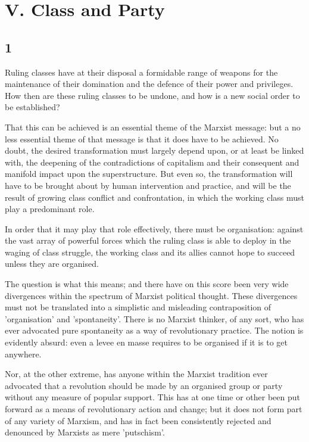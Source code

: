 \chapter*{V. Class and Party}


\section*{1}

Ruling classes have at their disposal a formidable range of weapons for the maintenance of their domination and the defence of their power and privileges. How then are these ruling classes to be undone, and how is a new social order to be established?

That this can be achieved is an essential theme of the Marxist message: but a no less essential theme of that message is that it does have to be achieved. No doubt, the desired transformation must largely depend upon, or at least be linked with, the deepening of the contradictions of capitalism and their consequent and manifold impact upon the superstructure. But even so, the transformation will have to be brought about by human intervention and practice, and will be the result of growing class conflict and confrontation, in which the working class must play a predominant role.

In order that it may play that role effectively, there must be organisation: against the vast array of powerful forces which the ruling class is able to deploy in the waging of class struggle, the working class and its allies cannot hope to succeed unless they are organised.

The question is what this means; and there have on this score been very wide divergences within the spectrum of Marxist political thought. These divergences must not be translated into a simplistic and misleading contraposition of 'organisation' and 'spontaneity'. There is no Marxist thinker, of any sort, who has ever advocated pure spontaneity as a way of revolutionary practice. The notion is evidently absurd: even a levee en masse requires to be organised if it is to get anywhere.

Nor, at the other extreme, has anyone within the Marxist tradition ever advocated that a revolution should be made by an organised group or party without any measure of popular support. This has at one time or other been put forward as a means of revolutionary action and change; but it does not form part of any variety of Marxism, and has in fact been consistently rejected and denounced by Marxists as mere 'putschism'.

